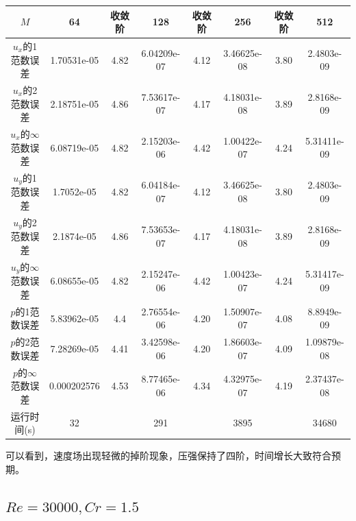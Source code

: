 \documentclass[lang=cn,10pt,bibend=bibtex]{elegantbook}
\begin{document}
\begin{table}[H]
  \centering
  \small
  \begin{tabular}{c|ccccccc}
  \textbf{$M$}              & 64          & 收敛阶 & 128         & 收敛阶 & 256         & 收敛阶 & 512   \\ \hline
  $u_x$的1范数误差 & 1.70531e-05 & 4.82 & 6.04209e-07 & 4.12 & 3.46625e-08 & 3.80 & 2.4803e-09\\
  $u_x$的2范数误差 & 2.18751e-05 & 4.86 & 7.53617e-07 & 4.17 & 4.18031e-08 & 3.89 & 2.8168e-09\\
  $u_x$的$\infty$范数误差 & 6.08719e-05 & 4.82 & 2.15203e-06 & 4.42 & 1.00422e-07 & 4.24 & 5.31411e-09\\
  $u_y$的1范数误差 & 1.7052e-05 & 4.82 & 6.04184e-07 & 4.12 & 3.46625e-08 & 3.80 & 2.4803e-09\\
  $u_y$的2范数误差 & 2.1874e-05 & 4.86 & 7.53653e-07 & 4.17 & 4.18031e-08 & 3.89 & 2.8168e-09\\
  $u_y$的$\infty$范数误差 & 6.08655e-05 & 4.82 & 2.15247e-06 & 4.42 & 1.00423e-07 & 4.24 & 5.31417e-09\\
  $p$的1范数误差 & 5.83962e-05 & 4.4 & 2.76554e-06 & 4.20 & 1.50907e-07 & 4.08 & 8.8949e-09\\
  $p$的2范数误差 & 7.28269e-05 & 4.41 & 3.42598e-06 & 4.20 & 1.86603e-07 & 4.09 & 1.09879e-08\\
  $p$的$\infty$范数误差 & 0.000202576 & 4.53 & 8.77465e-06 & 4.34 & 4.32975e-07 & 4.19 & 2.37437e-08\\  
  运行时间(s)                &      32      &       &     291      &       &     3895     &       &  34680
  \end{tabular}
\end{table}

可以看到，速度场出现轻微的掉阶现象，压强保持了四阶，时间增长大致符合预期。

\subsection{$Re=30000,Cr=1.5$}
\end{document}
